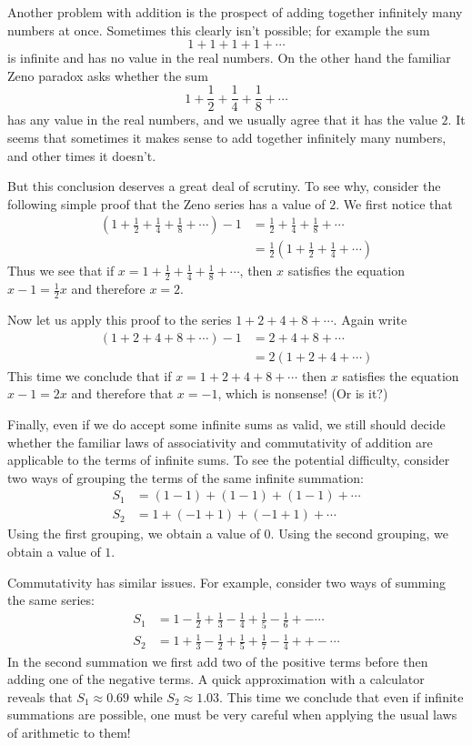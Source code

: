 \documentclass[11pt,oneside]{amsbook}
\theoremstyle{definition}
\theoremstyle{plain}
\theoremstyle{definition}
\theoremstyle{remark}
\numberwithin{equation}{section}
\numberwithin{figure}{section}
\begin{document}
Another problem with addition is the prospect of adding together infinitely many numbers at once. Sometimes this clearly isn't possible; for example the sum
\[1+1+1+1+\cdots
\]
is infinite and has no value in the real numbers. On the other hand the familiar Zeno paradox asks whether the sum
\[1+\frac12+\frac14+\frac18+\cdots
\]
has any value in the real numbers, and we usually agree that it has the value $2$. It seems that sometimes it makes sense to add together infinitely many numbers, and other times it doesn't.

But this conclusion deserves a great deal of scrutiny. To see why, consider the following simple proof that the Zeno series has a value of $2$. We first notice that
\begin{align*}
  \left(1+\frac12+\frac14+\frac18+\cdots\right)-1
  &=\frac12+\frac14+\frac18+\cdots\\                                  
  &=\frac12\left(1+\frac12+\frac14+\cdots\right)
\end{align*}
Thus we see that if $x=1+\frac12+\frac14+\frac18+\cdots$, then $x$ satisfies the equation $x-1=\frac12x$ and therefore $x=2$.

Now let us apply this proof to the series $1+2+4+8+\cdots$. Again write
\begin{align*}
  (1+2+4+8+\cdots)-1&=2+4+8+\cdots\\
                    &=2(1+2+4+\cdots)
\end{align*}
This time we conclude that if $x=1+2+4+8+\cdots$ then $x$ satisfies the equation $x-1=2x$ and therefore that $x=-1$, which is nonsense! (Or is it?)

Finally, even if we do accept some infinite sums as valid, we still should decide whether the familiar laws of associativity and commutativity of addition are applicable to the terms of infinite sums. To see the potential difficulty, consider two ways of grouping the terms of the same infinite summation:
\begin{align*}
S_1&=(1-1)+(1-1)+(1-1)+\cdots\\
S_2&=1+(-1+1)+(-1+1)+\cdots
\end{align*}
Using the first grouping, we obtain a value of $0$. Using the second grouping, we obtain a value of $1$.

Commutativity has similar issues. For example, consider two ways of summing the same series:
\begin{align*}
S_1&=1-\frac12+\frac13-\frac14+\frac15-\frac16+-\cdots\\
S_2&=1+\frac13-\frac12+\frac15+\frac17-\frac14++-\cdots
\end{align*}
In the second summation we first add two of the positive terms before then adding one of the negative terms. A quick approximation with a calculator reveals that $S_1\approx0.69$ while $S_2\approx1.03$. This time we conclude that even if infinite summations are possible, one must be very careful when applying the usual laws of arithmetic to them!
\end{document}
